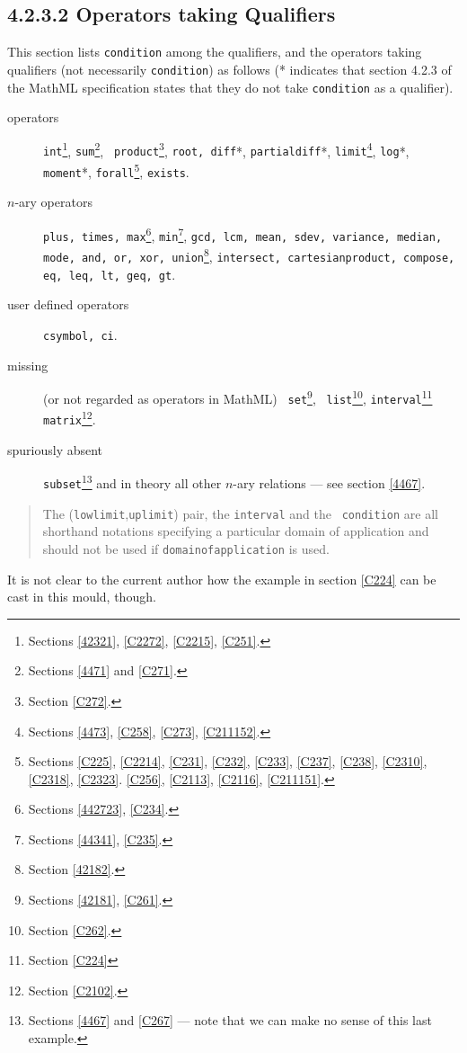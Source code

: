 \documentclass{llncs}
\begin{document}
{\subsection{4.2.3.2 Operators taking Qualifiers}\label{4232}
This section lists {\tt condition} among the qualifiers, and the operators
taking qualifiers (not necessarily {\tt condition}) as follows (* indicates
that section 4.2.3 of the MathML specification states that they do not take
{\tt condition} as a qualifier).
\begin{description}
\item[operators]{\tt int}\footnote{Sections \ref{42321}, \ref{C2272},
\ref{C2215}, \ref{C251}.}, {\tt sum}\footnote{Sections \ref{4471} and \ref{C271}.}, {\tt
product}\footnote{Section \ref{C272}.}, {\tt root, diff}*, {\tt partialdiff}*,
{\tt limit}\footnote{Sections \ref{4473}, \ref{C258}, \ref{C273}, \ref{C211152}.}, {\tt log}*,
{\tt moment}*, {\tt forall}\footnote{Sections
\ref{C225}, \ref{C2214}, \ref{C231}, \ref{C232}, \ref{C233}, \ref{C237},
\ref{C238}, \ref{C2310}, \ref{C2318}, \ref{C2323}. \ref{C256}, \ref{C2113},
\ref{C2116}, \ref{C211151}.}, {\tt exists}.
\item[$n$-ary operators]{\tt plus, times, max}\footnote{Sections \ref{442723},
\ref{C234}.},
{\tt min}\footnote{Sections \ref{44341}, \ref{C235}.}, {\tt gcd, lcm, mean, sdev,
variance, median, mode, and, or, xor, union}\footnote{Section \ref{42182}.},
{\tt intersect, cartesianproduct, compose, eq, leq, lt, geq, gt}.
\item[user defined operators]{\tt csymbol, ci}.
\item[missing](or not regarded as operators in MathML) {\tt
set}\footnote{Sections \ref{42181}, \ref{C261}.}, {\tt
list}\footnote{Section \ref{C262}.}, {\tt interval}\footnote{Section
\ref{C224}} {\tt matrix}\footnote{Section \ref{C2102}.}.
\item[spuriously absent]{\tt subset}\footnote{Sections \ref{4467} and
\ref{C267} --- note that we can make no sense of this last example.} and in
theory all other $n$-ary relations --- see section \ref{4467}.
\end{description}
\begin{quotation}\noindent
The ({\tt lowlimit},{\tt uplimit}) pair, the {\tt interval} and the {\tt
condition} are all shorthand notations specifying a particular domain of
application and should not be used if {\tt domainofapplication} is used.
\end{quotation}
It is not clear to the current author how the example in section \ref{C224}
can be cast in this mould, though.
}
\end{document}
